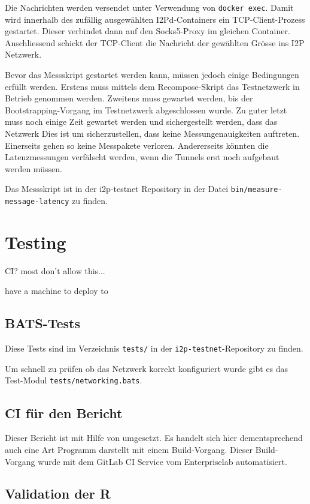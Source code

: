 Die Nachrichten werden versendet unter Verwendung von \lstinline|docker exec|.
Damit wird innerhalb des zufällig ausgewählten I2Pd-Containers ein TCP-Client-Prozess gestartet.
Dieser verbindet dann auf den Socks5-Proxy im gleichen Container.
Anschliessend schickt der TCP-Client die Nachricht der gewählten Grösse ins I2P Netzwerk.

Bevor das Messskript gestartet werden kann, müssen jedoch einige Bedingungen erfüllt werden.
Erstens muss mittels dem Recompose-Skript das Testnetzwerk in Betrieb genommen werden.
Zweitens muss gewartet werden, bis der Bootstrapping-Vorgang im Testnetzwerk abgeschlossen wurde.
Zu guter letzt muss noch einige Zeit gewartet werden und sichergestellt werden, dass das Netzwerk 
Dies ist um sicherzustellen, dass keine Messungenauigkeiten auftreten.
Einerseits gehen so keine Messpakete verloren. Andererseits könnten die Latenzmessungen verfälscht werden, wenn die Tunnels erst noch aufgebaut werden müssen.

Das Messskript ist in der i2p-testnet Repository in der Datei \lstinline|bin/measure-message-latency| zu finden.

\section{Testing}

CI? most don't allow this...

have a machine to deploy to

\subsection{BATS-Tests}

Diese Tests sind im Verzeichnis \lstinline|tests/| in der \lstinline|i2p-testnet|-Repository zu finden.

Um schnell zu prüfen ob das Netzwerk korrekt konfiguriert wurde gibt es das Test-Modul \lstinline|tests/networking.bats|.

\subsection{CI für den Bericht}

Dieser Bericht ist mit Hilfe von \LaTex umgesetzt.
Es handelt sich hier dementsprechend auch eine Art Programm darstellt mit einem Build-Vorgang.
Dieser Build-Vorgang wurde mit dem GitLab CI Service vom Enterpriselab automatisiert.

\subsection{Validation der R}

